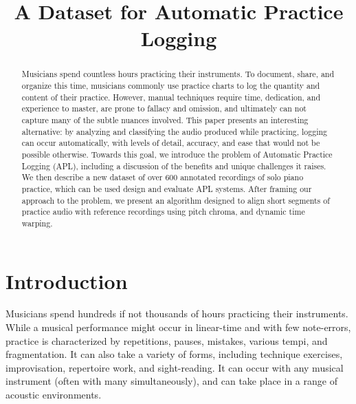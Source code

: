 \documentclass{article}
\title{A Dataset for Automatic Practice Logging}
\begin{document}
%
\maketitle
%
\begin{abstract}
Musicians spend countless hours practicing their instruments.  To document, share, and organize this time, musicians commonly use practice charts to log the quantity and content of their practice. However, manual techniques require time, dedication, and experience to master, are prone to fallacy and omission, and ultimately can not capture many of the subtle nuances involved.  This paper presents an interesting alternative: by analyzing and classifying the audio produced while practicing, logging can occur automatically, with levels of detail, accuracy, and ease that would not be possible otherwise. Towards this goal, we introduce the problem of Automatic Practice Logging (APL), including a discussion of the benefits and unique challenges it raises. We then describe a new dataset of over 600 annotated recordings of solo piano practice, which can be used design and evaluate APL systems. After framing our approach to the problem, we present an algorithm designed to align short segments of practice audio with reference recordings using pitch chroma, and dynamic time warping.

\end{abstract}
%
\section{Introduction}\label{sec:introduction}

Musicians spend hundreds if not thousands of hours practicing their instruments. 
While a musical performance might occur in linear-time and with few note-errors, practice is characterized by repetitions, pauses, mistakes, various tempi, and fragmentation.
It can also take a variety of forms, including technique exercises, improvisation, repertoire work, and sight-reading. It can occur with any musical instrument (often with many simultaneously), and can take place in a range of acoustic environments.    
\end{document}
